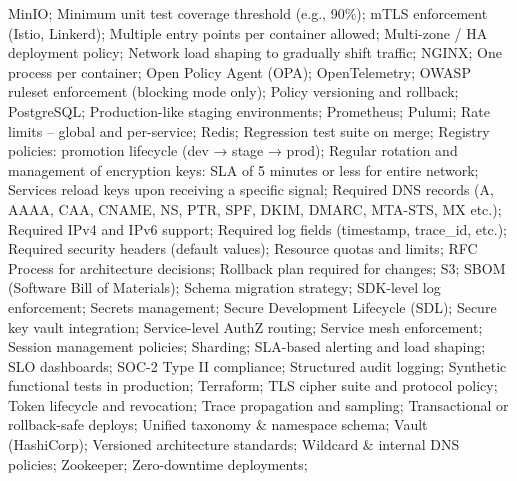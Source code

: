 \documentclass[letterpaper,11pt]{article}
\begin{document}
\begin{multicols}{3}
{\begin{itemize}[leftmargin=0.1in, label={}, itemsep=0pt, parsep=0pt, topsep=0pt, partopsep=0pt]
    MinIO;
    Minimum unit test coverage threshold (e.g., 90\%);
    mTLS enforcement (Istio, Linkerd);
    Multiple entry points per container allowed;
    Multi-zone / HA deployment policy;
    Network load shaping to gradually shift traffic;
    NGINX;
    One process per container;
    Open Policy Agent (OPA);
    OpenTelemetry;
    OWASP ruleset enforcement (blocking mode only);
    Policy versioning and rollback;
    PostgreSQL;
    Production-like staging environments;
    Prometheus;
    Pulumi;
    Rate limits – global and per-service;
    Redis;
    Regression test suite on merge;
    Registry policies: promotion lifecycle (dev → stage → prod);
    Regular rotation and management of encryption keys: SLA of 5 minutes or less for entire network; Services reload keys upon receiving a specific signal;
    Required DNS records (A, AAAA, CAA, CNAME, NS, PTR, SPF, DKIM, DMARC, MTA-STS, MX etc.);
    Required IPv4 and IPv6 support;
    Required log fields (timestamp, trace\_id, etc.);
    Required security headers (default values);
    Resource quotas and limits;
    RFC Process for architecture decisions;
    Rollback plan required for changes;
    S3;
    SBOM (Software Bill of Materials);
    Schema migration strategy;
    SDK-level log enforcement;
    Secrets management;
    Secure Development Lifecycle (SDL);
    Secure key vault integration;
    Service-level AuthZ routing;
    Service mesh enforcement;
    Session management policies;
    Sharding;
    SLA-based alerting and load shaping;
    SLO dashboards;
    SOC-2 Type II compliance;
    Structured audit logging;
    Synthetic functional tests in production;
    Terraform;
    TLS cipher suite and protocol policy;
    Token lifecycle and revocation;
    Trace propagation and sampling;
    Transactional or rollback-safe deploys;
    Unified taxonomy \& namespace schema;
    Vault (HashiCorp);
    Versioned architecture standards;
    Wildcard \& internal DNS policies;
    Zookeeper;
    Zero-downtime deployments;


\end{itemize}}
\end{multicols}
\end{document}
